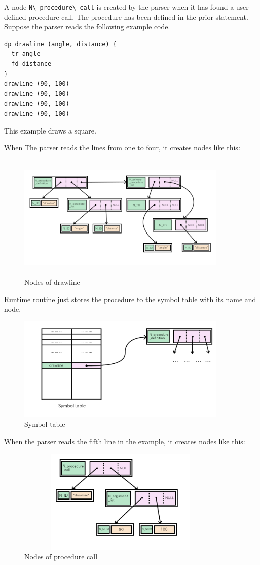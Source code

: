 A node \passthrough{\lstinline!N\_procedure\_call!} is created by the
parser when it has found a user defined procedure call. The procedure
has been defined in the prior statement. Suppose the parser reads the
following example code.

\begin{lstlisting}
dp drawline (angle, distance) {
  tr angle
  fd distance
}
drawline (90, 100)
drawline (90, 100)
drawline (90, 100)
drawline (90, 100)
\end{lstlisting}

This example draws a square.

When The parser reads the lines from one to four, it creates nodes like
this:

\begin{figure}
\centering
\includegraphics[width=10cm,height=6cm]{../image/tree2.png}
\caption{Nodes of drawline}
\end{figure}

Runtime routine just stores the procedure to the symbol table with its
name and node.

\begin{figure}
\centering
\includegraphics[width=10cm,height=5cm]{../image/table.png}
\caption{Symbol table}
\end{figure}

When the parser reads the fifth line in the example, it creates nodes
like this:

\begin{figure}
\centering
\includegraphics[width=10cm,height=5cm]{../image/proc_call.png}
\caption{Nodes of procedure call}
\end{figure}

